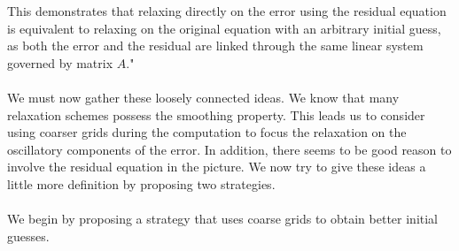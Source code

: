 \documentclass[11pt]{book}
\begin{document}
This demonstrates that relaxing directly on the error using the residual equation is equivalent to relaxing on the original equation with an arbitrary initial guess, as both the error and the residual are linked through the same linear system governed by matrix $A$."\\ \\
We must now gather these loosely connected ideas. We know that many relaxation schemes possess the smoothing property. This leads us to consider using coarser grids during the computation to focus the relaxation on the oscillatory components of the error. In addition, there seems to be good reason to involve the residual equation in the picture. We now try to give these ideas a little more definition by proposing two strategies. \\ \\
We begin by proposing a strategy that uses coarse grids to obtain better initial guesses.
\end{document}
